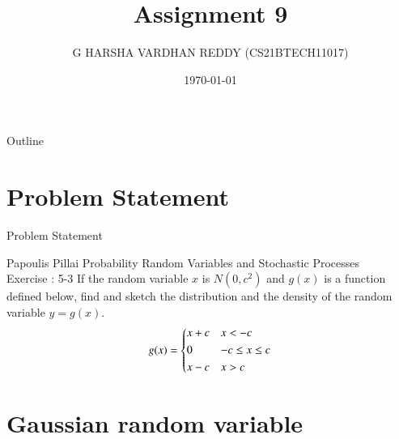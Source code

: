\documentclass{beamer}
\title{Assignment 9}
\author[CS21BTECH11017]{G HARSHA VARDHAN REDDY (CS21BTECH11017)}
\date{\today}
\begin{document}
\begin{frame}
    \titlepage 
\end{frame}
\logo{}


\begin{frame}{Outline}
    \tableofcontents
\end{frame}




\section{Problem Statement}
\begin{frame}{Problem Statement}

    \begin{block} {Papoulis Pillai Probability Random Variables and Stochastic Processes\\ 
    Exercise : 5-3} If the random variable $x$ is $N(0,c^2)$ and $g(x)$ is a function defined below,  find and sketch the
     distribution and the density of the random variable $y=g(x)$.
    \begin{align}
        g(x)=
    \begin{dcases}
        x+c & x < -c \\
        0 & -c \leq x \leq c \\
        x-c & x > c \\
    \end{dcases}
    \label{1}
    \end{align}
    \end{block}
    
\end{frame}


\section{Gaussian random variable}
\end{document}
